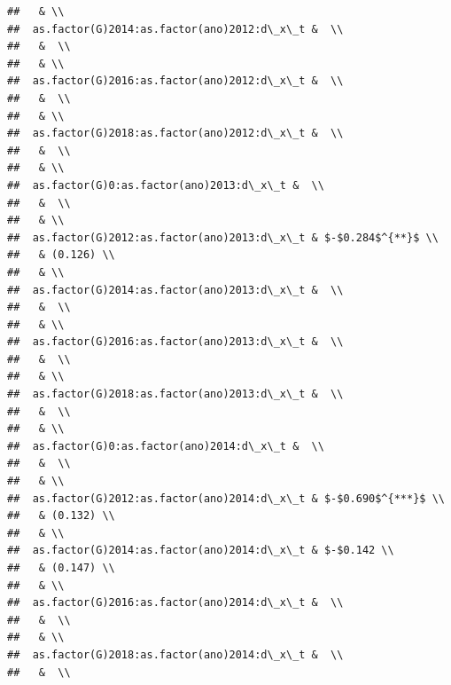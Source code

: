 \documentclass[
]{article}
\begin{document}
\begin{verbatim}
##   & \\ 
##  as.factor(G)2014:as.factor(ano)2012:d\_x\_t &  \\ 
##   &  \\ 
##   & \\ 
##  as.factor(G)2016:as.factor(ano)2012:d\_x\_t &  \\ 
##   &  \\ 
##   & \\ 
##  as.factor(G)2018:as.factor(ano)2012:d\_x\_t &  \\ 
##   &  \\ 
##   & \\ 
##  as.factor(G)0:as.factor(ano)2013:d\_x\_t &  \\ 
##   &  \\ 
##   & \\ 
##  as.factor(G)2012:as.factor(ano)2013:d\_x\_t & $-$0.284$^{**}$ \\ 
##   & (0.126) \\ 
##   & \\ 
##  as.factor(G)2014:as.factor(ano)2013:d\_x\_t &  \\ 
##   &  \\ 
##   & \\ 
##  as.factor(G)2016:as.factor(ano)2013:d\_x\_t &  \\ 
##   &  \\ 
##   & \\ 
##  as.factor(G)2018:as.factor(ano)2013:d\_x\_t &  \\ 
##   &  \\ 
##   & \\ 
##  as.factor(G)0:as.factor(ano)2014:d\_x\_t &  \\ 
##   &  \\ 
##   & \\ 
##  as.factor(G)2012:as.factor(ano)2014:d\_x\_t & $-$0.690$^{***}$ \\ 
##   & (0.132) \\ 
##   & \\ 
##  as.factor(G)2014:as.factor(ano)2014:d\_x\_t & $-$0.142 \\ 
##   & (0.147) \\ 
##   & \\ 
##  as.factor(G)2016:as.factor(ano)2014:d\_x\_t &  \\ 
##   &  \\ 
##   & \\ 
##  as.factor(G)2018:as.factor(ano)2014:d\_x\_t &  \\ 
##   &  \\ 

\end{verbatim}
\end{document}

